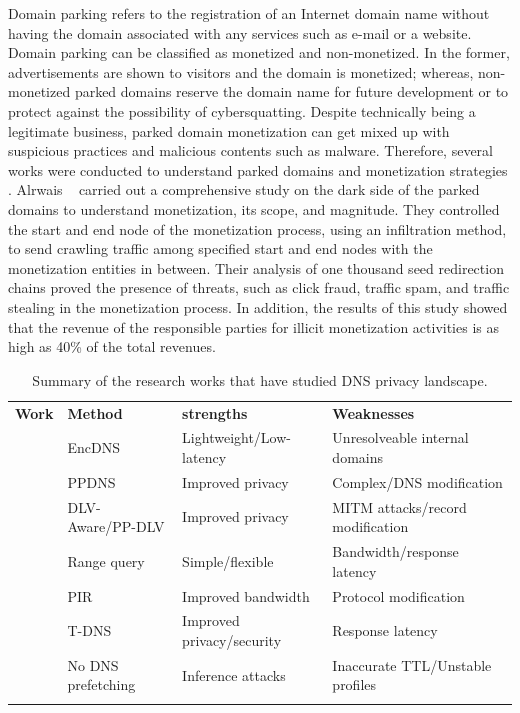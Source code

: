 \label{sec:Monetization}
Domain parking refers to the registration of an Internet domain name without having the domain  associated with any services such as e-mail or a website. Domain parking can be classified as monetized and non-monetized. In the former, advertisements are shown to visitors and the domain is monetized; whereas, non-monetized parked domains reserve the domain name for future development or to protect against the possibility of cybersquatting. Despite technically being a legitimate business, parked domain monetization can get mixed up with suspicious practices and malicious contents such as malware. Therefore, several works were conducted to understand  parked domains and monetization strategies . 
Alrwais \etal~ carried out a comprehensive study on the dark side of the parked domains to understand monetization, its scope, and magnitude. They controlled the start and end node of the monetization process, using an infiltration method, to send crawling traffic among specified start and end nodes with the monetization entities in between. Their analysis of one thousand seed redirection chains proved the presence of threats, such as click fraud, traffic spam, and traffic stealing in the monetization process. In addition, the results of this study showed that the revenue of the responsible parties for illicit monetization activities is as high as 40\% of the total revenues. 
\begin{table}[t]
\begin{center}
\caption{Summary of the research works that have studied DNS privacy landscape.}
\label{tab:SumPrivacy}
\begin{tabular}{l|l|l|l}
\Xhline{2\arrayrulewidth}
\textbf{Work} & \textbf{Method}  & \textbf{strengths}    &\textbf{Weaknesses} \\
\Xhline{2\arrayrulewidth}
 & EncDNS & Lightweight/Low-latency & Unresolveable internal domains \\ \hline
 & PPDNS & Improved privacy & Complex/DNS modification \\ \hline
 & DLV-Aware/PP-DLV & Improved privacy & MITM attacks/record modification \\
 & Range query & Simple/flexible & Bandwidth/response latency \\ \hline
 & PIR & Improved bandwidth  & Protocol modification\\ \hline
 & T-DNS & Improved privacy/security & Response latency \\ \hline
 & No DNS prefetching & Inference attacks  & Inaccurate TTL/Unstable profiles\\ \hline
\Xhline{2\arrayrulewidth}
\end{tabular}
\end{center}
\end{table}
